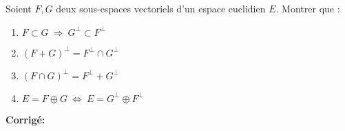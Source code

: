 \documentclass[a4paper,twoside,french,11pt]{VcCours}
\newcommand{\corr}{\textbf{Corrigé:}}
\begin{document}
\begin{Exercice}{} Soient $F, G$ deux sous-espaces vectoriels d'un espace euclidien $E.$ Montrer que :

\begin{multicols}{2}
\begin{enumerate}
\item $F\subset G \ \Longrightarrow \ G^{\perp}\subset F^{\perp}$
\item $(F+G)^{\perp}=F^{\perp}\cap G^{\perp}$
\columnbreak
\item $(F\cap G)^{\perp}=F^{\perp}+G^{\perp}$
\item $E=F\oplus G \ \Longleftrightarrow \ E=G^{\perp}\oplus F^{\perp}$
\end{enumerate}
\end{multicols}
\end{Exercice}

\corr
\end{document}
